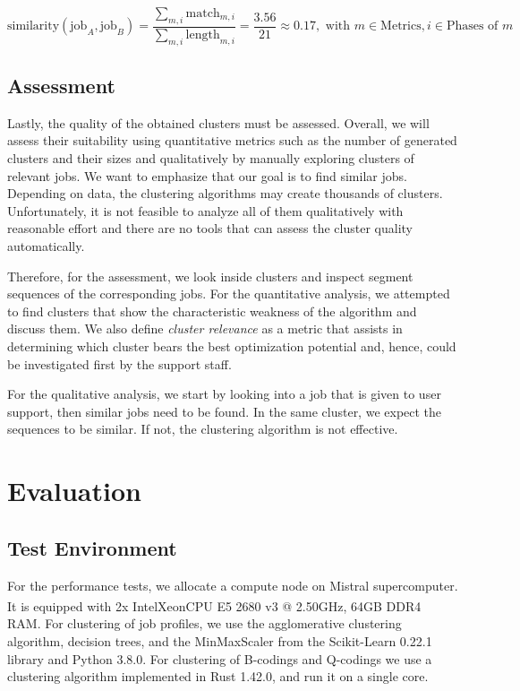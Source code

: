 \documentclass{jhps}
\begin{document}
\begin{equation}\label{lst:pm_quant:phase_matching_example:similarity}
	\text{similarity}(\text{job}_A, \text{job}_B) = \frac{\sum_{m,i}{\text{match}_{m,i}}}{\sum_{m,i}{\text{length}_{m,i}}} = \frac{3.56}{21} \approx 0.17, \text{ with } m \in \text{Metrics}, i \in \text{Phases of } m
\end{equation}


\subsection{Assessment}
Lastly, the quality of the obtained clusters must be assessed.
Overall, we will assess their suitability using quantitative metrics such as the number of generated clusters and their sizes and qualitatively by manually exploring clusters of relevant jobs.
We want to emphasize that our goal is to find similar jobs.
Depending on data, the clustering algorithms may create thousands of clusters.
Unfortunately, it is not feasible to analyze all of them qualitatively with reasonable effort and there are no tools that can assess the cluster quality automatically.

Therefore, for the assessment, we look inside clusters and inspect segment sequences of the corresponding jobs.
For the quantitative analysis, we attempted to find clusters that show the characteristic weakness of the algorithm and discuss them.
We also define \textit{cluster relevance} as a metric that assists in determining which cluster bears the best optimization potential and, hence, could be investigated first by the support staff.

For the qualitative analysis, we start by looking into a job that is given to user support, then similar jobs need to be found.
In the same cluster, we expect the sequences to be similar.
If not, the clustering algorithm is not effective.



\section{Evaluation}%
\label{sec:evaluation}

\subsection{Test Environment}%
\label{sec:test_environment}
For the performance tests, we allocate a compute node on Mistral supercomputer.
It is equipped with 2x Intel\textsuperscript\textregistered\@ Xeon\textsuperscript\textregistered\@ CPU E5 2680 v3 @ 2.50GHz, 64GB DDR4 RAM\@.
For clustering of job profiles, we use the agglomerative clustering algorithm, decision trees, and the MinMaxScaler from the Scikit-Learn 0.22.1 library and Python 3.8.0.
For clustering of B-codings and Q-codings we use a clustering algorithm implemented in Rust 1.42.0, and run it on a single core.
\end{document}
